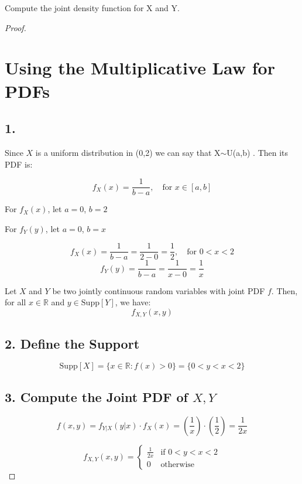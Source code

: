 \documentclass[12pt]{amsart}
\theoremstyle{remark}
\numberwithin{equation}{section} \numberwithin{thm}{section}
\numberwithin{rmk}{section} \numberwithin{figure}{section}
\begin{document}
\title{}



Compute the joint density function for X and Y.


\begin{proof}



\section*{Using the Multiplicative Law for PDFs}

\subsection*{1.}

Since \( X \) is a uniform distribution in (0,2) we can say that X$\sim$U(a,b) . Then its PDF is:

\[
f_X(x) = \frac{1}{b - a}, \quad \text{for } x \in [a, b]
\]

For \( f_X(x) \), let \( a = 0 \), \( b = 2 \)


For \( f_Y(y) \), let \( a = 0 \), \( b = x \)

\[
f_X(x) = \frac{1}{b - a} = \frac{1}{2 - 0} = \frac{1}{2}, \quad \text{for } 0 < x < 2
\]
\[
f_Y(y) = \frac{1}{b - a} = \frac{1}{x - 0} = \frac{1}{x}
\]

Let \( X \) and \( Y \) be two jointly continuous random variables with joint PDF \( f \). Then, for all \( x \in \mathbb{R} \) and \( y \in \text{Supp}[Y] \), we have:
\[
f_{X,Y}(x, y)
\]

\subsection*{2. Define the Support}

\[
\text{Supp}[X] = \{ x \in \mathbb{R} : f(x) > 0 \} = \{ 0 < y < x < 2 \}
\]

\subsection*{3. Compute the Joint PDF of \( X, Y \)}

\[
f(x, y) = f_{Y|X}(y|x) \cdot f_X(x) = \left( \frac{1}{x} \right) \cdot \left( \frac{1}{2} \right) = \frac{1}{2x}
\]

\[
f_{X,Y}(x, y) =
\begin{cases}
\frac{1}{2x} & \text{if } 0 < y < x < 2 \\
0 & \text{otherwise}
\end{cases}
\]
\end{proof}
\end{document}
